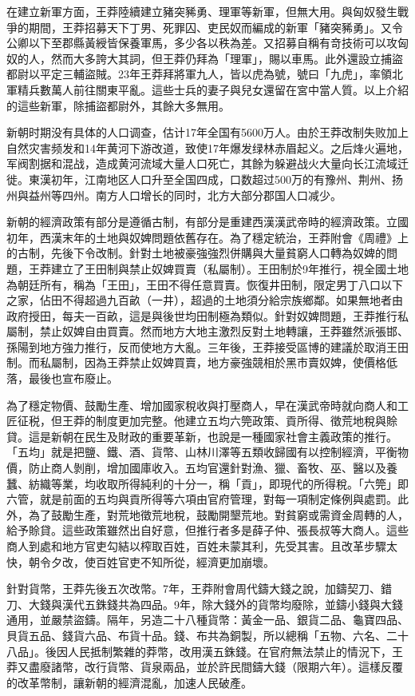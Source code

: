 在建立新軍方面，王莽陸續建立豬突豨勇、理軍等新軍，但無大用。與匈奴發生戰爭的期間，王莽招募天下丁男、死罪囚、吏民奴而編成的新軍「豬突豨勇」。又令公卿以下至郡縣黃綬皆保養軍馬，多少各以秩為差。又招募自稱有竒技術可以攻匈奴的人，然而大多誇大其詞，但王莽仍拜為「理軍」，賜以車馬。此外還設立捕盜都尉以平定三輔盜賊。23年王莽拜將軍九人，皆以虎為號，號曰「九虎」，率領北軍精兵數萬人前往關東平亂。這些士兵的妻子與兒女還留在宮中當人質。以上介紹的這些新軍，除捕盜都尉外，其餘大多無用。

新朝时期没有具体的人口调查，估计17年全国有5600万人。由於王莽改制失败加上自然灾害频发和14年黄河下游改道，致使17年爆发绿林赤眉起义。之后烽火遍地，军阀割据和混战，造成黄河流域大量人口死亡，其餘为躲避战火大量向长江流域迁徙。東漢初年，江南地区人口升至全国四成，口数超过500万的有豫州、荆州、扬州與益州等四州。南方人口增长的同时，北方大部分郡国人口减少。

新朝的經濟政策有部分是遵循古制，有部分是重建西漢漢武帝時的經濟政策。立國初年，西漢末年的土地與奴婢問題依舊存在。為了穩定統治，王莽附會《周禮》上的古制，先後下令改制。針對土地被豪強強烈併購與大量貧窮人口轉為奴婢的問題，王莽建立了王田制與禁止奴婢買賣（私屬制）。王田制於9年推行，視全國土地為朝廷所有，稱為「王田」，王田不得任意買賣。恢復井田制，限定男丁八口以下之家，佔田不得超過九百畝（一井），超過的土地須分給宗族鄉鄰。如果無地者由政府授田，每夫一百畝，這是與後世均田制極為類似。針對奴婢問題，王莽推行私屬制，禁止奴婢自由買賣。然而地方大地主激烈反對土地轉讓，王莽雖然派張邯、孫陽到地方強力推行，反而使地方大亂。三年後，王莽接受區博的建議於取消王田制。而私屬制，因為王莽禁止奴婢買賣，地方豪強競相於黑市賣奴婢，使價格低落，最後也宣布廢止。

為了穩定物價、鼓勵生產、增加國家稅收與打壓商人，早在漢武帝時就向商人和工匠征税，但王莽的制度更加完整。他建立五均六筦政策、貢所得、徵荒地稅與賒貸。這是新朝在民生及財政的重要革新，也說是一種國家社會主義政策的推行。「五均」就是把鹽、鐵、酒、貨幣、山林川澤等五類收歸國有以控制經濟，平衡物價，防止商人剝削，增加國庫收入。五均官還針對漁、獵、畜牧、巫、醫以及養蠶、紡織等業，均收取所得純利的十分一，稱「貢」，即現代的所得稅。「六筦」即六管，就是前面的五均與貢所得等六項由官府管理，對每一項制定條例與處罰。此外，為了鼓勵生產，對荒地徵荒地稅，鼓勵開墾荒地。對貧窮或需資金周轉的人，給予賒貸。這些政策雖然出自好意，但推行者多是薛子仲、張長叔等大商人。這些商人到處和地方官吏勾結以榨取百姓，百姓未蒙其利，先受其害。且改革步驟太快，朝令夕改，使百姓官吏不知所從，經濟更加崩壞。

針對貨幣，王莽先後五次改幣。7年，王莽附會周代鑄大錢之說，加鑄契刀、錯刀、大錢與漢代五銖錢共為四品。9年，除大錢外的貨幣均廢除，並鑄小錢與大錢通用，並嚴禁盜鑄。隔年，另造二十八種貨幣：黃金一品、銀貨二品、龜寶四品、貝貨五品、錢貨六品、布貨十品。錢、布共為銅製，所以總稱「五物、六名、二十八品」。後因人民抵制繁雜的莽幣，改用漢五銖錢。在官府無法禁止的情況下，王莽又盡廢諸幣，改行貨幣、貨泉兩品，並於許民間鑄大錢（限期六年）。這樣反覆的改革幣制，讓新朝的經濟混亂，加速人民破產。

